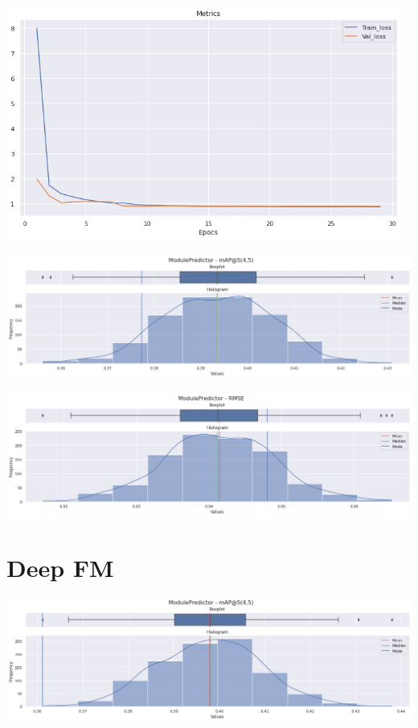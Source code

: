 \documentclass[11pt,a4paper,twoside]{thesis}
\begin{document}
\begin{center}
	\includegraphics[width=13cm]{./images/metrics-NN-FM-train-val-loss.png}
\end{center}

\begin{center}
	\includegraphics[width=16cm]{./images/metrics-NN-FM-mapk.png}
\end{center}


\begin{center}
	\includegraphics[width=16cm]{./images/metrics-NN-FM-RMSE.png}
\end{center}


\section{Deep FM}

\begin{center}
	\includegraphics[width=16cm]{./images/metrics-DeepFM-mapk.png}
\end{center}
\end{document}
